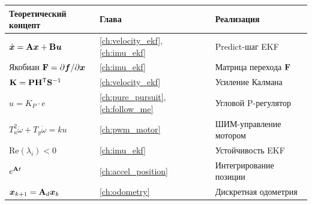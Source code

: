 \begin{center}
\begin{tabular}{lll}
\toprule
\textbf{Теоретический концепт} & \textbf{Глава} & \textbf{Реализация}\\
\midrule
$\dot{\bm{x}} = \mathbf{A}\bm{x} + \mathbf{B}\bm{u}$ & \ref{ch:velocity_ekf}, \ref{ch:imu_ekf}
  & Predict-шаг EKF\\
Якобиан $\mathbf{F} = \partial\bm{f}/\partial\bm{x}$ & \ref{ch:imu_ekf}
  & Матрица перехода $\mathbf{F}$\\
$\mathbf{K} = \mathbf{P}\mathbf{H}^{\mathsf{T}}\mathbf{S}^{-1}$ & \ref{ch:velocity_ekf}
  & Усиление Калмана\\
$u = K_P \cdot e$ & \ref{ch:pure_pursuit}, \ref{ch:follow_me}
  & Угловой P-регулятор\\
$T_a^2\ddot{\omega} + T_y\dot{\omega} = ku$ & \ref{ch:pwm_motor}
  & ШИМ-управление мотором\\
$\mathrm{Re}(\lambda_i) < 0$ & \ref{ch:imu_ekf}
  & Устойчивость EKF\\
$e^{\mathbf{A}t}$ & \ref{ch:accel_position}
  & Интегрирование позиции\\
$\bm{x}_{k+1} = \mathbf{A}_d\bm{x}_k$ & \ref{ch:odometry}
  & Дискретная одометрия\\
\bottomrule
\end{tabular}
\end{center}
